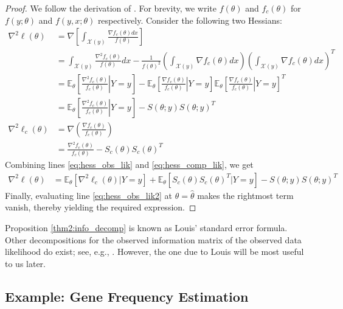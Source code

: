 \documentclass[11pt, oneside]{article}   	%
\newcommand{\bE}{\mathbb{E}}
\begin{document}
\begin{proof}
    We follow the derivation of \citet{Lou82}. For brevity, we write $f(\theta)$ and $f_c(\theta)$ for $f(y; \theta)$ and $f(y, x; \theta)$ respectively. Consider the following two Hessians:
    \begin{align}
        \nabla^2 \ell(\theta) &= \nabla \left[ \int_{\mathcal{X}(y)} \frac{\nabla f_c(\theta) dx}{f(\theta)} \right]\\
        &= \int_{\mathcal{X}(y)} \frac{\nabla^2 f_c(\theta)}{f(\theta)} dx - \frac{1}{f(\theta)^2}\left( \int_{\mathcal{X}(y)} \nabla f_c(\theta) dx \right) \left( \int_{\mathcal{X}(y)} \nabla f_c(\theta) dx \right)^T\\
        &= \bE_\theta \left[ \left. \frac{\nabla^2 f_c(\theta)}{f_c(\theta)} \right| Y=y \right] - \bE_\theta \left[ \left. \frac{\nabla f_c(\theta)}{f_c(\theta)} \right| Y=y \right] \bE_\theta \left[ \left. \frac{\nabla f_c(\theta)}{f_c(\theta)} \right| Y=y \right]^T\\
        &= \bE_\theta \left[ \left. \frac{\nabla^2 f_c(\theta)}{f_c(\theta)} \right| Y=y \right] - S(\theta; y) S(\theta; y)^T \label{eq:hess_obs_lik}\\
        \nabla^2 \ell_c(\theta) &= \nabla \left( \frac{\nabla f_c(\theta)}{f_c(\theta)} \right)\\
        &= \frac{\nabla^2 f_c(\theta)}{f_c(\theta)} - S_c(\theta) S_c(\theta)^T \label{eq:hess_comp_lik}
    \end{align}
    Combining lines \ref{eq:hess_obs_lik} and \ref{eq:hess_comp_lik}, we get
    \begin{align}
        \nabla^2 \ell(\theta) &= \bE_\theta [ \nabla^2 \ell_c(\theta) | Y=y] + \bE_\theta [ S_c(\theta) S_c(\theta)^T | Y=y] - S(\theta; y) S(\theta; y)^T \label{eq:hess_obs_lik2}
    \end{align}
    Finally, evaluating line \ref{eq:hess_obs_lik2} at $\theta = \hat{\theta}$ makes the rightmost term vanish, thereby yielding the required expression.
\end{proof}

Proposition \ref{thm2:info_decomp} is known as Louis' standard error formula. Other decompositions for the observed information matrix of the observed data likelihood do exist; see, e.g., \citet{Oak99,McL08}. However, the one due to Louis will be most useful to us later.

\subsection{Example: Gene Frequency Estimation}
\label{sec2:eg-genes}
\end{document}
